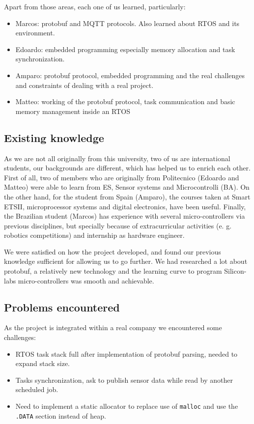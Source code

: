 \documentclass[10pt,a4]{article}
\begin{document}
Apart from those areas, each one of us learned, particularly:

\begin{itemize}
    \item Marcos: protobuf and MQTT protocols. Also learned about RTOS and its environment.
    \item Edoardo: embedded programming especially memory allocation and task synchronization.
    \item Amparo: protobuf protocol, embedded programming and the real challenges and constraints of dealing with a real project.
    \item Matteo: working of the protobuf protocol, task communication and basic memory management inside an RTOS
\end{itemize}


\subsection{Existing knowledge}

As we are not all originally from this university, two of us are international students, our backgrounds are different, which has helped us to enrich each other. First of all, two of members who are originally from Politecnico (Edoardo and Matteo) were able to learn from ES, Sensor systems and Microcontrolli (BA). On the other hand, for the student from Spain (Amparo), the courses taken at Smart ETSII, microprocessor systems and digital electronics, have been useful. Finally, the Brazilian student (Marcos) has experience with several micro-controllers via previous disciplines, but specially because of extracurricular activities (e. g. robotics competitions) and internship as hardware engineer.

We were satisfied on how the project developed, and found our previous knowledge sufficient for allowing us to go further. We had researched a lot about protobuf, a relatively new technology and the learning curve to program Silicon-labs micro-controllers was smooth and achievable.

\subsection{Problems encountered}

As the project is integrated within a real company we encountered some challenges:

\begin{itemize}
\item RTOS task stack full after implementation of protobuf parsing, needed to expand stack size. 
\item Tasks synchronization, ask to publish sensor data while read by another scheduled job.
 \item Need to implement a static allocator to replace use of \texttt{malloc} and use the \texttt{.DATA} section instead of heap.
\end{itemize}
\end{document}
